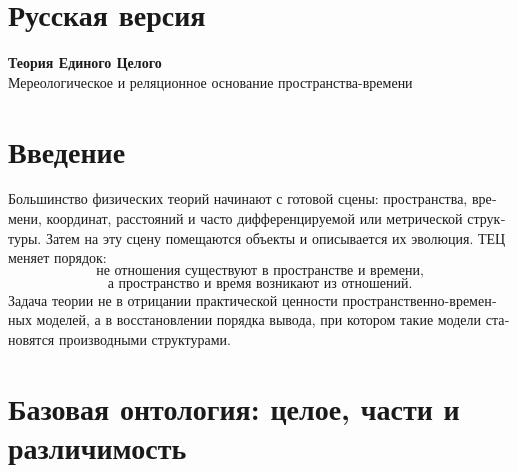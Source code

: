 \documentclass[11pt,a4paper]{article}
\theoremstyle{definition}
\theoremstyle{plain}
\theoremstyle{remark}
\newcommand{\Whole}{U}
\newcommand{\Parts}{\mathcal A}
\newcommand{\Vstruct}{\mathbf V}
\begin{document}
\newpage
\begin{russian}

\section*{Русская версия}

\begin{center}
{\Large\textbf{Теория Единого Целого}}\\
\large Мереологическое и реляционное основание пространства-времени
\end{center}

\begin{abstract}
Теория Единого Целого (ТЕЦ) предлагается как формальный реляционный каркас, в
котором пространство, время, движение, расстояние, масса и энергия не являются
первичными понятиями, а выводятся как производные структуры. Построение
начинается с целого \(\Whole\), мереологической решётки частей \(\Parts\),
различимости и отношений со значениями в нормированной упорядоченной группе
\(\Vstruct\). Реляционное расстояние получается из нормированных значений
отношений, неравенство треугольника выводится из композиции отношений, время
задаётся как структура изменений между состояниями, а механические величины
определяются как инварианты реляционного изменения. Также приводится конечная
модель, устанавливающая относительную непротиворечивость базовых аксиом.
\end{abstract}

\section{Введение}

Большинство физических теорий начинают с готовой сцены: пространства, времени,
координат, расстояний и часто дифференцируемой или метрической структуры. Затем
на эту сцену помещаются объекты и описывается их эволюция. ТЕЦ меняет порядок:
\[
\boxed{\text{не отношения существуют в пространстве и времени,}}
\]
\[
\boxed{\text{а пространство и время возникают из отношений.}}
\]
Задача теории не в отрицании практической ценности пространственно-временных
моделей, а в восстановлении порядка вывода, при котором такие модели становятся
производными структурами.

\section{Базовая онтология: целое, части и различимость}


\end{russian}
\end{document}

